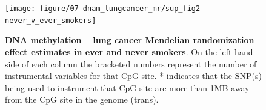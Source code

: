 \documentclass[11pt,twoside]{bristolthesis}
\begin{document}
\begin{figure}

{\centering \texttt{[image: figure/07-dnam\_lungcancer\_mr/sup\_fig2-never\_v\_ever\_smokers]} 

}

\caption[DNA methylation -- lung cancer Mendelian randomization effect estimates in ever and never smokers]{\textbf{DNA methylation -- lung cancer Mendelian randomization effect estimates in ever and never smokers}. On the left-hand side of each column the bracketed numbers represent the number of instrumental variables for that CpG site. * indicates that the SNP(s) being used to instrument that CpG site are more than 1MB away from the CpG site in the genome (trans).}\label{fig:sup-fig2-07}
\end{figure}
\end{document}
